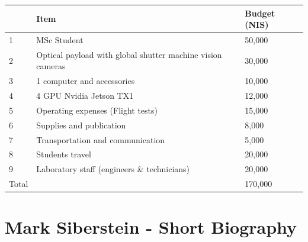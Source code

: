 \documentclass{article} %
\begin{document}
\begin{center}
	\begin{tabular}{ | l | l | l | }
		\hline
		      & Item                                                       & Budget (NIS) \\ \hline
		1     & MSc Student                                                & 50,000       \\ \hline
		2     & Optical payload with global shutter machine vision cameras & 30,000       \\ \hline
		3     & 1 computer and accessories                                 & 10,000       \\ \hline
		4     & 4 GPU Nvidia Jetson TX1                                    & 12,000       \\ \hline
		5     & Operating expenses (Flight tests)                          & 15,000       \\ \hline
		6     & Supplies and publication                                   & 8,000        \\ \hline
		7     & Transportation and communication                           & 5,000        \\ \hline
		8     & Students travel                                            & 20,000       \\ \hline
		9     & Laboratory staff (engineers \& technicians)                & 20,000       \\ \hline
		Total &                                                            & 170,000      \\ \hline
	\end{tabular}
\end{center}

\section{Mark Siberstein - Short Biography}



\end{document}
